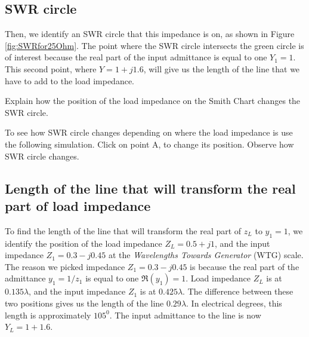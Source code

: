 \documentclass{ximera}
\begin{document}
\subsection*{SWR circle}
Then, we identify an SWR circle that this impedance is on, as shown in Figure \ref{fig:SWRfor25Ohm}. The point where the SWR circle intersects the green circle is of interest because the real part of the input admittance is equal to one $Y_1=1$. This second point, where $Y=1+j1.6$, will give us the length of the line that we have to add to the load impedance. 


\begin{example}
Explain how the position of the load impedance on the Smith Chart changes the SWR circle.
\begin{explanation}
To see how SWR circle changes depending on where the load impedance is use the following simulation. Click on point A, to change its position. Observe how SWR circle changes.
\begin{center}  
\end{center} 
\end{explanation}

\end{example}

\subsection{Length of the line that will transform the real part of load impedance}

To find the length of the line that will transform the real part of $z_L$ to $y_{1}=1$, we identify the position of the load impedance $Z_L=0.5+j1$, and the input impedance $Z_1=0.3-j0.45$ at the {\it Wavelengths Towards Generator} (WTG) scale. The reason we picked impedance $Z_1=0.3-j0.45$ is because the real part of the admittance $y_1=1/z_1$ is equal to one $\Re(y_{1})=1$. Load impedance  $Z_L$ is at $0.135 \lambda$, and the input impedance $Z_1$ is at $0.425 \lambda$. The difference between these two positions gives us the length of the line $0.29 \lambda$. In electrical degrees, this length is approximately $105^0$. The input admittance to the line is now $Y_L=1+1.6$.
\end{document}
